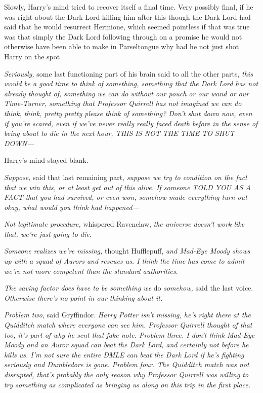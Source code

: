 Slowly, Harry's mind tried to recover itself a final time. Very possibly final,
if he was right about the Dark Lord killing him after this{\el} though the
Dark Lord had said that he would resurrect Hermione, which seemed pointless if
that was true{\el} was that simply the Dark Lord following through on a
promise he would not otherwise have been able to make in Parseltongue{\el}
why had he not just shot Harry on the spot{\el}

\emph{Seriously,} some last functioning part of his brain said to all the other
parts, \emph{this would be a good time to think of something, something that
the Dark Lord has not already thought of, something we can do without our pouch
or our wand or our Time-Turner, something that Professor Quirrell has not
imagined we can do{\el} think, think, pretty pretty please think of
something? Don't shut down now, even if you're scared, even if we've never
really really faced death before in the sense of being about to die in the next
hour, THIS IS NOT THE TIME TO SHUT DOWN---}

Harry's mind stayed blank.

\emph{Suppose,} said that last remaining part, \emph{suppose we try to
condition on the fact that we win this, or at least get out of this alive. If
someone TOLD YOU AS A FACT that you had survived, or even won, somehow made
everything turn out okay, what would you think had happened---}

\emph{Not legitimate procedure,} whispered Ravenclaw, \emph{the universe
doesn't work like that, we're just going to die.}

\emph{Someone realizes we're missing,} thought Hufflepuff, \emph{and Mad-Eye
Moody shows up with a squad of Aurors and rescues us. I think the time has come
to admit we're not more competent than the standard authorities.}

\emph{The saving factor does have to be something we} do \emph{somehow,} said
the last voice. \emph{Otherwise there's no point in our thinking about it.}

\emph{Problem two,} said Gryffindor. \emph{Harry Potter isn't missing, he's
right there at the Quidditch match where everyone can see him. Professor
Quirrell thought of that too, it's part of why he sent that fake note. Problem
three. I don't think Mad-Eye Moody and an Auror squad can beat the Dark Lord,
and certainly not before he kills us. I'm not sure the entire DMLE can beat the
Dark Lord if he's fighting seriously and Dumbledore is gone. Problem four. The
Quidditch match was not disrupted, that's probably the only reason why
Professor Quirrell was willing to try something as complicated as bringing us
along on this trip in the first place.}

